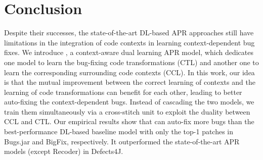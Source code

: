 \section{Conclusion}


Despite their successes, the state-of-the-art DL-based APR approaches
still have limitations in the integration of code contexts in learning
context-dependent bug fixes. We introduce {\tool}, a context-aware
dual learning APR model, which dedicates one model to learn the
bug-fixing code transformations (CTL) and another one to learn the
corresponding surrounding code contexts (CCL). In this work, our idea
is that the mutual improvement between the correct learning of
contexts and the learning of code transformations can benefit for each
other, leading to better auto-fixing the context-dependent bugs.
%
Instead of cascading
the two models, we train them simultaneously
via a cross-stitch unit to exploit the duality between CCL and CTL.
Our empirical results show that {\tool} can auto-fix
more bugs than the best-performance DL-based baseline model with only
the top-1 patches in Bugs.jar and BigFix, respectively.
It outperformed the state-of-the-art APR models (except Recoder)
in Defects4J.
